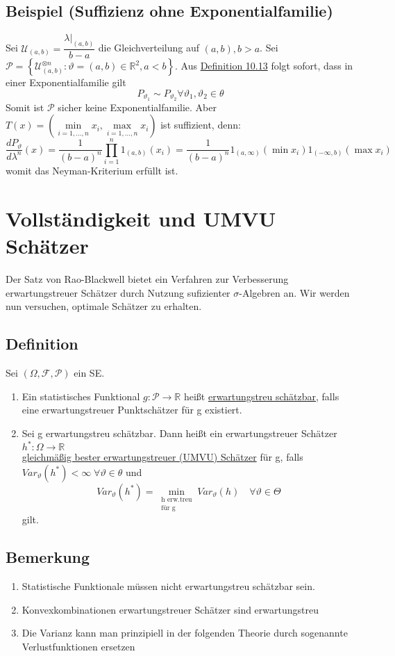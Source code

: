 \documentclass[german,10pt,oneside, fleqn, a4paper]{article}
\newcommand {\R}	{\mathbb{R}}
\newcommand{\ra}{\rightarrow}
\newcommand{\brc}[1]{\left(#1\right)}
\newcommand{\brac}[1]{\left\lbrace #1\right\rbrace}
\newcommand{\mc}[1]{\mathcal{#1}}
\newcommand{\1}[1]{1_{#1}}
\newcommand{\2}[1]{\1{\brac{#1}}}
\newcommand{\f}{\mc{F}}
\newcommand{\p}{\mc{P}}
\newcommand{\stuff}{{\otimes n}}
\begin{document}
\subsection{Beispiel (Suffizienz ohne Exponentialfamilie)}
\label{10.16} 
Sei $\mc{U}_{(a,b)}=\dfrac{\lambda\vert_{(a,b)}}{b-a}$ die Gleichverteilung auf $(a,b), b>a$. Sei \\
$\mc{P}=\brac{\mc{U}_{(a,b)}^\stuff:\vartheta=(a,b)\in\R^2, a<b}$. Aus \hyperref[10.13]{Definition 10.13} folgt sofort, dass in einer Exponentialfamilie gilt\[
P_{\vartheta_1}\sim P_{\vartheta_2}\forall\vartheta_1,\vartheta_2\in\theta\]
Somit ist $\mc{P}$ sicher keine Exponentialfamilie. Aber $T(x)=\brc{\min\limits_{i=1,...,n}x_i,\max\limits_{i=1,...,n}x_i}$ ist suffizient, denn:\[
\dfrac{dP_\vartheta}{d\lambda^n}(x)=\dfrac{1}{(b-a)^n}\prod\limits_{i=1}^n1_{(a,b)}(x_i)=\dfrac{1}{(b-a)^n}1_{(a,\infty)}(\min x_i)1_{(-\infty,b)}(\max x_i)
\]
womit das Neyman-Kriterium erfüllt ist.

\pagebreak
\section{Vollständigkeit und UMVU Schätzer}
Der Satz von Rao-Blackwell bietet ein Verfahren zur Verbesserung erwartungstreuer Schätzer durch Nutzung sufizienter $\sigma$-Algebren an. Wir werden nun versuchen, optimale Schätzer zu erhalten.

\subsection{Definition}
\label{11.1}
Sei $(\Omega,\f,\p)$ ein SE.\begin{enumerate}[label=(\alph*)]
\item Ein statistisches Funktional $g:\mc{P}\ra\R$ heißt \underline{erwartungstreu schätzbar}, falls eine erwartungstreuer Punktschätzer für g existiert.
\item Sei g erwartungstreu schätzbar. Dann heißt ein erwartungstreuer Schätzer $h^*:\Omega\ra\R$\\
\underline{gleichmäßig bester erwartungstreuer (UMVU) Schätzer} für g, falls $Var_\vartheta(h^*)<\infty\;\forall\vartheta\in\theta$ und\[
Var_{\vartheta}(h^*)=\min\limits_{\substack{\text{h erw.treu}\\\text{für g}}}Var_\vartheta(h)\quad\forall\vartheta\in\Theta\] gilt.
\end{enumerate}

\subsection{Bemerkung}
\begin{enumerate}[label=(\roman*)]
\item Statistische Funktionale müssen nicht erwartungstreu schätzbar sein.
\item Konvexkombinationen erwartungstreuer Schätzer sind erwartungstreu
\item Die Varianz kann man prinzipiell in der folgenden Theorie durch sogenannte Verlustfunktionen ersetzen
\end{enumerate}
\end{document}

